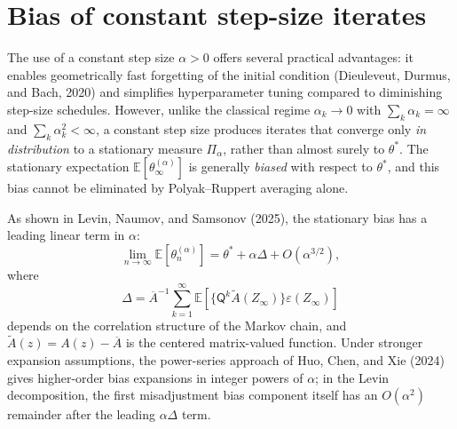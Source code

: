\section{Bias of constant step-size iterates}

The use of a constant step size $\alpha>0$ offers several practical
advantages: it enables geometrically fast forgetting of the initial condition
(Dieuleveut, Durmus, and Bach, 2020) and simplifies hyperparameter tuning
compared to diminishing step-size schedules. However, unlike the classical
regime $\alpha_k\to0$ with $\sum_k\alpha_k=\infty$ and
$\sum_k\alpha_k^2<\infty$, a constant step size produces iterates that
converge only \emph{in distribution} to a stationary measure $\Pi_\alpha$,
rather than almost surely to $\theta^*$. The stationary expectation
$\mathbb{E}[\theta_\infty^{(\alpha)}]$ is generally \emph{biased} with respect
to $\theta^*$, and this bias cannot be eliminated by Polyak--Ruppert averaging
alone.

As shown in Levin, Naumov, and Samsonov (2025), the stationary bias has a
leading linear term in $\alpha$:
\begin{equation}
  \lim_{n\to\infty}\mathbb{E}[\theta_n^{(\alpha)}]
  = \theta^*+\alpha\Delta+O(\alpha^{3/2}),
  \label{eq:bias-expansion}
\end{equation}
where
\[
  \Delta
  = \overline{A}^{-1}\sum_{k=1}^{\infty}
    \mathbb{E}\!\left[
      \bigl\{\mathsf{Q}^k\widetilde{A}(Z_\infty)\bigr\}
      \varepsilon(Z_\infty)
    \right]
\]
depends on the correlation structure of the Markov chain, and
$\widetilde{A}(z)=A(z)-\overline{A}$ is the centered matrix-valued function.
Under stronger expansion assumptions, the power-series approach of Huo, Chen,
and Xie (2024) gives higher-order bias expansions in integer powers of
$\alpha$; in the Levin decomposition, the first misadjustment bias component
itself has an $O(\alpha^2)$ remainder after the leading $\alpha\Delta$ term.
